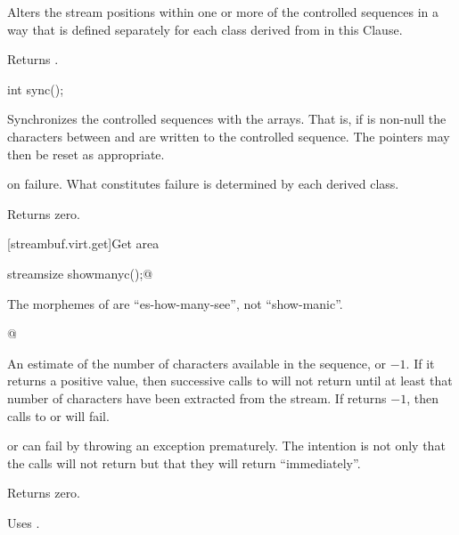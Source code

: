 \begin{itemdescr}
\pnum
\effects
Alters the stream positions within one or more of
the controlled sequences in a way that is defined separately for each class
derived from
in this Clause.

\pnum
{}
Returns
.
\end{itemdescr}

%
\begin{itemdecl}
int sync();
\end{itemdecl}

\begin{itemdescr}
\pnum
\effects
Synchronizes the controlled sequences with the arrays.
That is, if
is non-null the characters between
and
are written to the controlled sequence.
The pointers may then be reset as appropriate.

\pnum
\returns
{} on failure.
What constitutes failure is determined by each derived class.

\pnum
{}
Returns zero.
\end{itemdescr}

[streambuf.virt.get]{Get area}

%
\begin{itemdecl}
streamsize showmanyc();@
\begin{footnote}
The morphemes of  are ``es-how-many-see'', not ``show-manic''.
\end{footnote}@
\end{itemdecl}

\begin{itemdescr}
\pnum
\returns
An estimate of the number of
characters available in the sequence, or $-1$.
If it returns
a positive value, then successive calls to
will not return
until at least that number of characters have been
extracted from the stream.
If
returns $-1$, then calls to
or
will fail.
\begin{footnote}
or
can fail by throwing an exception prematurely.
The intention is not only that the calls will not return
but that they will return ``immediately''.
\end{footnote}

\pnum
{}
Returns zero.

\pnum
\remarks
Uses
.
\end{itemdescr}

